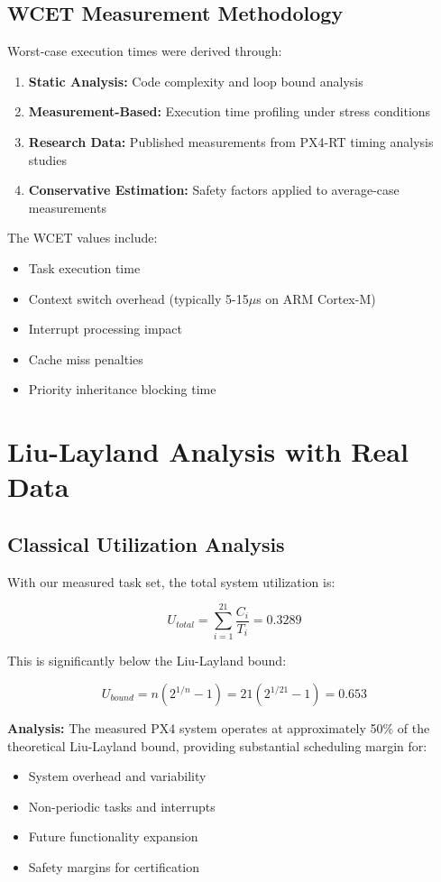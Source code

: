 \documentclass[12pt,a4paper]{article}
\begin{document}
\subsection{WCET Measurement Methodology}

Worst-case execution times were derived through:

\begin{enumerate}
\item \textbf{Static Analysis:} Code complexity and loop bound analysis
\item \textbf{Measurement-Based:} Execution time profiling under stress conditions
\item \textbf{Research Data:} Published measurements from PX4-RT timing analysis studies
\item \textbf{Conservative Estimation:} Safety factors applied to average-case measurements
\end{enumerate}

The WCET values include:
\begin{itemize}
\item Task execution time
\item Context switch overhead (typically 5-15$\mu$s on ARM Cortex-M)
\item Interrupt processing impact
\item Cache miss penalties
\item Priority inheritance blocking time
\end{itemize}

\section{Liu-Layland Analysis with Real Data}

\subsection{Classical Utilization Analysis}

With our measured task set, the total system utilization is:

$$U_{total} = \sum_{i=1}^{21} \frac{C_i}{T_i} = 0.3289$$

This is significantly below the Liu-Layland bound:

$$U_{bound} = n(2^{1/n} - 1) = 21(2^{1/21} - 1) = 0.653$$

\textbf{Analysis:} The measured PX4 system operates at approximately 50\% of the theoretical Liu-Layland bound, providing substantial scheduling margin for:
\begin{itemize}
\item System overhead and variability
\item Non-periodic tasks and interrupts
\item Future functionality expansion
\item Safety margins for certification
\end{itemize}
\end{document}
